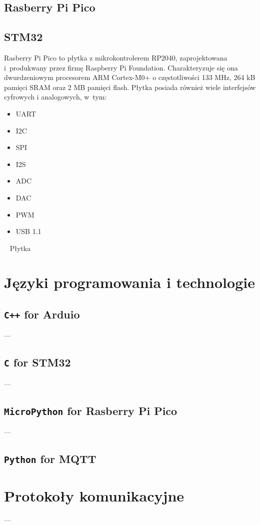 \subsection{Rasberry Pi Pico}

\subsection{STM32}
Rasberry Pi Pico to płytka z mikrokontrolerem RP2040, zaprojektowana i~produkwany przez firmę Raspberry Pi Foundation. Charakteryzuje się ona dwurdzeniowym procesorem ARM Cortex-M0+ o częstotliwości 133 MHz, 264 kB pamięci SRAM oraz 2 MB pamięci flash. Płytka posiada również wiele interfejsów cyfrowych i analogowych, w~tym:
\begin{itemize}
    \item UART
    \item I2C
    \item SPI
    \item I2S
    \item ADC
    \item DAC
    \item PWM
    \item USB 1.1
\end{itemize}
~\cite{PICO:datasheet,PICO:doc}
Płytka

\section{Języki programowania i technologie}
\subsection{\texttt{C++} for Arduio}
---
\subsection{\texttt{C} for STM32}
---
\subsection{\texttt{MicroPython} for Rasberry Pi Pico}
---
\subsection{\texttt{Python} for MQTT}

\section{Protokoły komunikacyjne}
---
